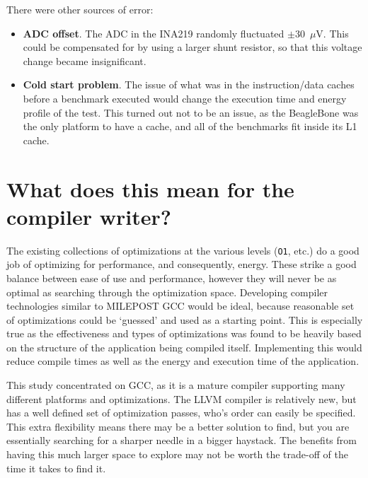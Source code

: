 \documentclass[twocolumn]{article}
\newcommand{\nsection}[1]{\section{\bfseries #1}}
\begin{document}
There were other sources of error:
\begin{itemize}
	\item \textbf{ADC offset}. The ADC in the INA219 randomly fluctuated $\pm$30~$\mu$V. This could be compensated for by using a larger shunt resistor, so that this voltage change became insignificant.
	\item \textbf{Cold start problem}. The issue of what was in the instruction/data caches before a benchmark executed would change the execution time and energy profile of the test. This turned out not to be an issue, as the BeagleBone was the only platform to have a cache, and all of the benchmarks fit inside its L1 cache.
\end{itemize}







\nsection{What does this mean for the compiler writer?}

The existing collections of optimizations at the various levels (\texttt{O1}, etc.) do a good job of optimizing for performance, and consequently, energy. These strike a good balance between ease of use and performance, however they will never be as optimal as searching through the optimization space. Developing compiler technologies similar to MILEPOST GCC would be ideal, because reasonable set of optimizations could be `guessed' and used as a starting point. This is especially true as the effectiveness and types of optimizations was found to be heavily based on the structure of the application being compiled itself. Implementing this would reduce compile times as well as the energy and execution time of the application.

This study concentrated on GCC, as it is a mature compiler supporting many different platforms and optimizations. The LLVM compiler is relatively new, but has a well defined set of optimization passes, who's order can easily be specified. This extra flexibility means there may be a better solution to find, but you are essentially searching for a sharper needle in a bigger haystack. The benefits from having this much larger space to explore may not be worth the trade-off of the time it takes to find it.
\end{document}
